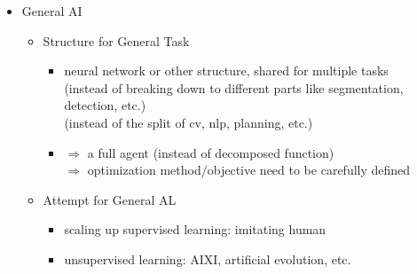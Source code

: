 \begin{itemize}
\item General AI
	\begin{itemize}
	\item Structure for General Task
		\begin{itemize}
		\item neural network or other structure, shared for multiple tasks \\
		(instead of breaking down to different parts like segmentation, detection, etc.) \\
		(instead of the split of cv, nlp, planning, etc.)
		\item $\Rightarrow$ a full agent (instead of decomposed function) \\
		$\Rightarrow$ optimization method/objective need to be carefully defined
		\end{itemize}
	\item Attempt for General AL
		\begin{itemize}
		\item scaling up supervised learning: imitating human
		\item unsupervised learning: AIXI, artificial evolution, etc.
		\end{itemize}
	\end{itemize}


\end{itemize}
